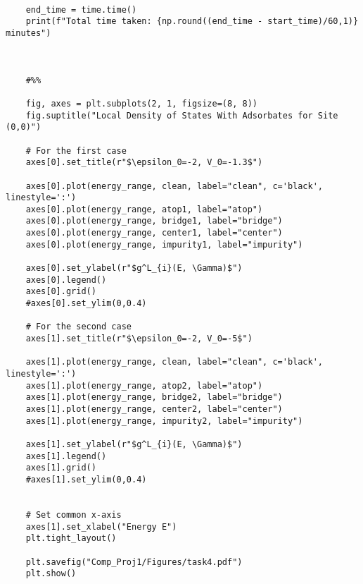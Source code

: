 \begin{verbatim}
    
    end_time = time.time()
    print(f"Total time taken: {np.round((end_time - start_time)/60,1)} minutes")
    
    
    
    #%%
    
    fig, axes = plt.subplots(2, 1, figsize=(8, 8))
    fig.suptitle("Local Density of States With Adsorbates for Site (0,0)")
    
    # For the first case 
    axes[0].set_title(r"$\epsilon_0=-2, V_0=-1.3$")
    
    axes[0].plot(energy_range, clean, label="clean", c='black', linestyle=':')
    axes[0].plot(energy_range, atop1, label="atop")
    axes[0].plot(energy_range, bridge1, label="bridge")
    axes[0].plot(energy_range, center1, label="center")
    axes[0].plot(energy_range, impurity1, label="impurity")
    
    axes[0].set_ylabel(r"$g^L_{i}(E, \Gamma)$")
    axes[0].legend()
    axes[0].grid()
    #axes[0].set_ylim(0,0.4)
    
    # For the second case 
    axes[1].set_title(r"$\epsilon_0=-2, V_0=-5$")
    
    axes[1].plot(energy_range, clean, label="clean", c='black', linestyle=':')
    axes[1].plot(energy_range, atop2, label="atop")
    axes[1].plot(energy_range, bridge2, label="bridge")
    axes[1].plot(energy_range, center2, label="center")
    axes[1].plot(energy_range, impurity2, label="impurity")
    
    axes[1].set_ylabel(r"$g^L_{i}(E, \Gamma)$")
    axes[1].legend()
    axes[1].grid()
    #axes[1].set_ylim(0,0.4)
    
    
    # Set common x-axis
    axes[1].set_xlabel("Energy E")
    plt.tight_layout()
    
    plt.savefig("Comp_Proj1/Figures/task4.pdf")
    plt.show()    
\end{verbatim}